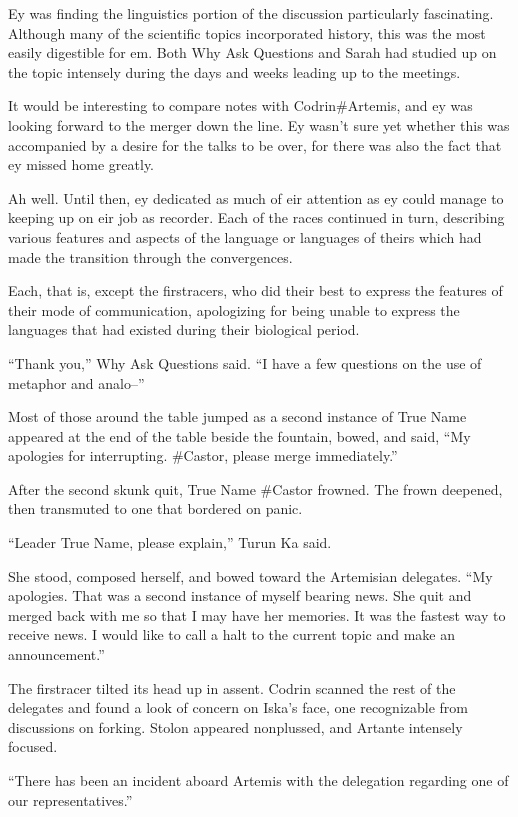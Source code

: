 Ey was finding the linguistics portion of the discussion particularly fascinating. Although many of the scientific topics incorporated history, this was the most easily digestible for em. Both Why Ask Questions and Sarah had studied up on the topic intensely during the days and weeks leading up to the meetings.

It would be interesting to compare notes with Codrin\#Artemis, and ey was looking forward to the merger down the line. Ey wasn't sure yet whether this was accompanied by a desire for the talks to be over, for there was also the fact that ey missed home greatly.

Ah well. Until then, ey dedicated as much of eir attention as ey could manage to keeping up on eir job as recorder. Each of the races continued in turn, describing various features and aspects of the language or languages of theirs which had made the transition through the convergences.

Each, that is, except the firstracers, who did their best to express the features of their mode of communication, apologizing for being unable to express the languages that had existed during their biological period.

``Thank you,'' Why Ask Questions said. ``I have a few questions on the use of metaphor and analo--''

Most of those around the table jumped as a second instance of True Name appeared at the end of the table beside the fountain, bowed, and said, ``My apologies for interrupting. \#Castor, please merge immediately.''

After the second skunk quit, True Name \#Castor frowned. The frown deepened, then transmuted to one that bordered on panic.

``Leader True Name, please explain,'' Turun Ka said.

She stood, composed herself, and bowed toward the Artemisian delegates. ``My apologies. That was a second instance of myself bearing news. She quit and merged back with me so that I may have her memories. It was the fastest way to receive news. I would like to call a halt to the current topic and make an announcement.''

The firstracer tilted its head up in assent. Codrin scanned the rest of the delegates and found a look of concern on Iska's face, one recognizable from discussions on forking. Stolon appeared nonplussed, and Artante intensely focused.

``There has been an incident aboard Artemis with the delegation regarding one of our representatives.''

